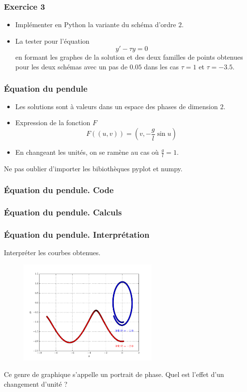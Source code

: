 \begin{frame}
  \frametitle{Exercice 3}
\begin{itemize}
  \item Implémenter en Python la variante du schéma d'ordre $2$.
  \item La tester pour l'équation
\begin{equation*}
  y' - \tau y =0
\end{equation*}
en formant les graphes de la solution et des deux familles de points obtenues pour les deux schémas avec un pas de $0.05$ dans les cas $\tau=1$ et $\tau=-3.5$.
\end{itemize}
\end{frame}

\begin{frame}
  \frametitle{\'Equation du pendule}
\begin{itemize}
  \item Les solutions sont à valeurs dans un espace des phases de dimension $2$.
  \item Expression de la fonction $F$
\begin{displaymath}
  F((u,v)) = (v,-\frac{g}{l}\sin u)
\end{displaymath}
  \item En changeant les unités, on se ramène au cas où $\frac{g}{l}=1$. 
\end{itemize}
Ne pas oublier d'importer les bibiothèques pyplot et numpy.
\end{frame}

\begin{frame}
  \frametitle{\'Equation du pendule. Code}

\end{frame}

\begin{frame}
  \frametitle{\'Equation du pendule. Calculs}

\end{frame}

\begin{frame}
  \frametitle{\'Equation du pendule. Interprétation}
Interpréter les courbes obtenues.
\begin{figure}[H]
  \centering
  \includegraphics[width=7cm]{./resolnumeqdiff_1_fig.pdf}
\end{figure}
Ce genre de graphique s'appelle un portrait de phase.\newline
Quel est l'effet d'un changement d'unité ?
\end{frame}


